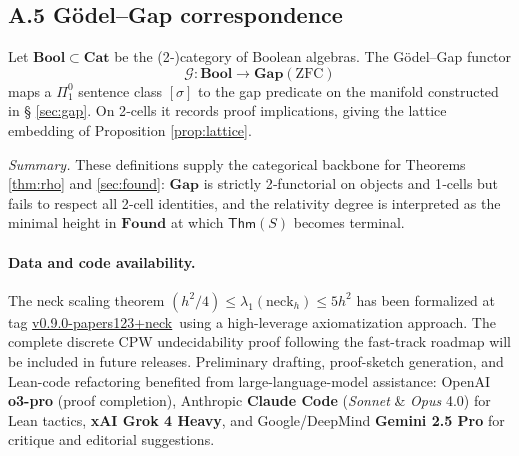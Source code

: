 \documentclass[11pt]{article}
\newcommand{\leanRepoTag}{%
  \href{https://github.com/AICardiologist/FoundationRelativity/tree/v0.9.0-papers123+neck}%
       {v0.9.0-papers123+neck}}
\newcommand{\llmNote}{%
  Preliminary drafting, proof-sketch generation, and Lean-code
  refactoring benefited from large-language-model assistance:
  OpenAI \textbf{o3-pro} (proof completion),
  Anthropic \textbf{Claude Code} (\emph{Sonnet} \& \emph{Opus} 4.0) for Lean tactics,
  \textbf{xAI Grok 4 Heavy}, and Google/DeepMind \textbf{Gemini 2.5 Pro}
  for critique and editorial suggestions.
}
\theoremstyle{definition}\newtheorem{definition}[theorem]{Definition}
\theoremstyle{remark}\newtheorem{remark}[theorem]{Remark}
\newcommand{\Found}{\mathbf{Found}}
\newcommand{\Gap}{\mathbf{Gap}}
\begin{document}
\subsection*{A.5 Gödel–Gap correspondence}
Let \(\mathbf{Bool}\subset\mathbf{Cat}\) be the (2‑)category of Boolean
algebras.  The Gödel–Gap functor
\[
  \mathcal G:\mathbf{Bool}\longrightarrow\Gap(\mathrm{ZFC})
\]
maps a $\Pi^0_1$ sentence class $[\sigma]$ to the gap predicate on the
manifold constructed in § \ref{sec:gap}.  On 2‑cells it records proof
implications, giving the lattice embedding of
Proposition \ref{prop:lattice}.

\vspace{0.5em}
\noindent
\emph{Summary.}  These definitions supply the categorical backbone for
Theorems \ref{thm:rho} and \ref{sec:found}: $\Gap$ is strictly
2‑functorial on objects and 1‑cells but fails to respect all 2‑cell
identities, and the relativity degree is interpreted as the minimal
height in \(\Found\) at which $\mathsf{Thm}(S)$ becomes terminal.


\paragraph{Data and code availability.}
The neck scaling theorem $(h^2/4) \leq \lambda_1(\text{neck}_h) \leq 5h^2$ has been 
formalized at tag \leanRepoTag\ using a high-leverage axiomatization approach.
The complete discrete CPW undecidability proof following the fast-track roadmap 
will be included in future releases.
\llmNote
\end{document}
